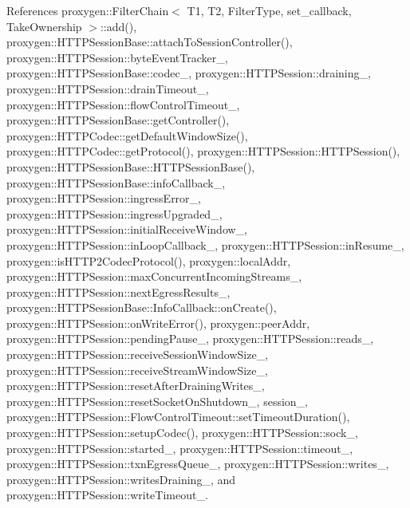 References proxygen\+::\+Filter\+Chain$<$ T1, T2, Filter\+Type, set\+\_\+callback, Take\+Ownership $>$\+::add(), proxygen\+::\+H\+T\+T\+P\+Session\+Base\+::attach\+To\+Session\+Controller(), proxygen\+::\+H\+T\+T\+P\+Session\+::byte\+Event\+Tracker\+\_\+, proxygen\+::\+H\+T\+T\+P\+Session\+Base\+::codec\+\_\+, proxygen\+::\+H\+T\+T\+P\+Session\+::draining\+\_\+, proxygen\+::\+H\+T\+T\+P\+Session\+::drain\+Timeout\+\_\+, proxygen\+::\+H\+T\+T\+P\+Session\+::flow\+Control\+Timeout\+\_\+, proxygen\+::\+H\+T\+T\+P\+Session\+Base\+::get\+Controller(), proxygen\+::\+H\+T\+T\+P\+Codec\+::get\+Default\+Window\+Size(), proxygen\+::\+H\+T\+T\+P\+Codec\+::get\+Protocol(), proxygen\+::\+H\+T\+T\+P\+Session\+::\+H\+T\+T\+P\+Session(), proxygen\+::\+H\+T\+T\+P\+Session\+Base\+::\+H\+T\+T\+P\+Session\+Base(), proxygen\+::\+H\+T\+T\+P\+Session\+Base\+::info\+Callback\+\_\+, proxygen\+::\+H\+T\+T\+P\+Session\+::ingress\+Error\+\_\+, proxygen\+::\+H\+T\+T\+P\+Session\+::ingress\+Upgraded\+\_\+, proxygen\+::\+H\+T\+T\+P\+Session\+::initial\+Receive\+Window\+\_\+, proxygen\+::\+H\+T\+T\+P\+Session\+::in\+Loop\+Callback\+\_\+, proxygen\+::\+H\+T\+T\+P\+Session\+::in\+Resume\+\_\+, proxygen\+::is\+H\+T\+T\+P2\+Codec\+Protocol(), proxygen\+::local\+Addr, proxygen\+::\+H\+T\+T\+P\+Session\+::max\+Concurrent\+Incoming\+Streams\+\_\+, proxygen\+::\+H\+T\+T\+P\+Session\+::next\+Egress\+Results\+\_\+, proxygen\+::\+H\+T\+T\+P\+Session\+Base\+::\+Info\+Callback\+::on\+Create(), proxygen\+::\+H\+T\+T\+P\+Session\+::on\+Write\+Error(), proxygen\+::peer\+Addr, proxygen\+::\+H\+T\+T\+P\+Session\+::pending\+Pause\+\_\+, proxygen\+::\+H\+T\+T\+P\+Session\+::reads\+\_\+, proxygen\+::\+H\+T\+T\+P\+Session\+::receive\+Session\+Window\+Size\+\_\+, proxygen\+::\+H\+T\+T\+P\+Session\+::receive\+Stream\+Window\+Size\+\_\+, proxygen\+::\+H\+T\+T\+P\+Session\+::reset\+After\+Draining\+Writes\+\_\+, proxygen\+::\+H\+T\+T\+P\+Session\+::reset\+Socket\+On\+Shutdown\+\_\+, session\+\_\+, proxygen\+::\+H\+T\+T\+P\+Session\+::\+Flow\+Control\+Timeout\+::set\+Timeout\+Duration(), proxygen\+::\+H\+T\+T\+P\+Session\+::setup\+Codec(), proxygen\+::\+H\+T\+T\+P\+Session\+::sock\+\_\+, proxygen\+::\+H\+T\+T\+P\+Session\+::started\+\_\+, proxygen\+::\+H\+T\+T\+P\+Session\+::timeout\+\_\+, proxygen\+::\+H\+T\+T\+P\+Session\+::txn\+Egress\+Queue\+\_\+, proxygen\+::\+H\+T\+T\+P\+Session\+::writes\+\_\+, proxygen\+::\+H\+T\+T\+P\+Session\+::writes\+Draining\+\_\+, and proxygen\+::\+H\+T\+T\+P\+Session\+::write\+Timeout\+\_\+.


